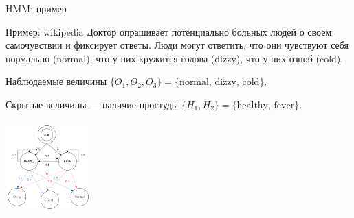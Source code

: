 \begin{frame}{HMM: пример}
\begin{block}{Пример: wikipedia}
Доктор опрашивает потенциально больных людей о своем самочувствии и фиксирует ответы. 
Люди могут ответить, что они чувствуют себя нормально (normal), что у них кружится голова (dizzy), что у них озноб (cold).

Наблюдаемые величины $\{O_1, O_2, O_3\} = \{\text{normal, dizzy, cold}\}.$

Скрытые величины --- наличие простуды $\{H_1, H_2\} = \{\text{healthy, fever}\}.$  


\end{block}
\centering
\includegraphics[width=0.25\textwidth]{cold.png}
\end{frame}



